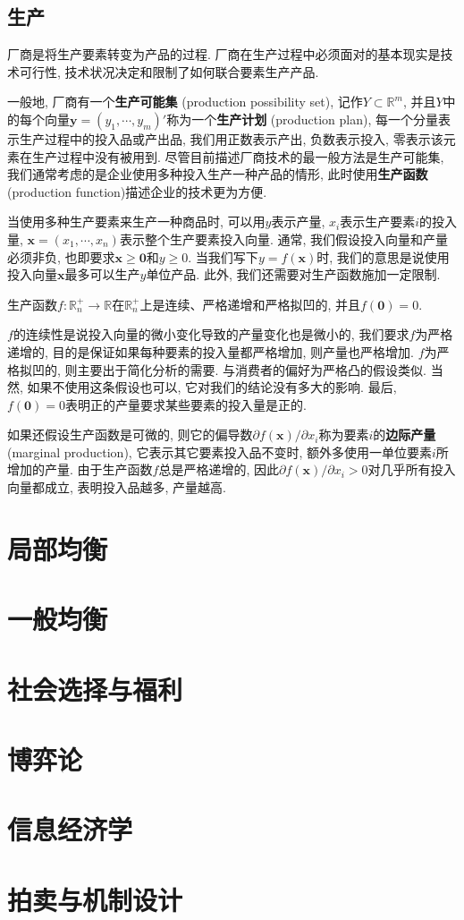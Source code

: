 \documentclass[cn, 12pt, math=mtpro2, bibstyle=apa, blue]{elegantbook}
\newcommand{\R}{\mathbb{R}}
\newcommand{\x}{\mathbf{x}}
\begin{document}
\section{生产}
厂商是将生产要素转变为产品的过程. 厂商在生产过程中必须面对的基本现实是技术可行性, 技术状况决定和限制了如何联合要素生产产品. 

一般地, 厂商有一个\textbf{生产可能集} (production possibility set), 记作$Y\subset\R^m$, 并且$Y$中的每个向量$\mathbold{y}=(y_1,\cdots,y_m)'$称为一个\textbf{生产计划} (production plan), 每一个分量表示生产过程中的投入品或产出品, 我们用正数表示产出, 负数表示投入, 零表示该元素在生产过程中没有被用到. 尽管目前描述厂商技术的最一般方法是生产可能集, 我们通常考虑的是企业使用多种投入生产一种产品的情形, 此时使用\textbf{生产函数} (production function)描述企业的技术更为方便.

当使用多种生产要素来生产一种商品时, 可以用$y$表示产量, $x_i$表示生产要素$i$的投入量, $\x=(x_1,\cdots,x_n)$表示整个生产要素投入向量. 通常, 我们假设投入向量和产量必须非负, 也即要求$\x\ge \mathbf{0}$和$y\ge0$. 当我们写下$y=f(\x)$时, 我们的意思是说使用投入向量$\x$最多可以生产$y$单位产品. 此外, 我们还需要对生产函数施加一定限制.

\begin{definition}
生产函数$f:\R_n^+\to\R$在$\R_n^+$上是连续、严格递增和严格拟凹的, 并且$f(\mathbf{0})=0$.
\end{definition}

$f$的连续性是说投入向量的微小变化导致的产量变化也是微小的, 我们要求$f$为严格递增的, 目的是保证如果每种要素的投入量都严格增加, 则产量也严格增加. $f$为严格拟凹的, 则主要出于简化分析的需要. 与消费者的偏好为严格凸的假设类似. 当然, 如果不使用这条假设也可以, 它对我们的结论没有多大的影响. 最后, $f(\mathbf{0})=0$表明正的产量要求某些要素的投入量是正的.

如果还假设生产函数是可微的, 则它的偏导数$\partial f(\x)/\partial x_i$称为要素$i$的\textbf{边际产量} (marginal production), 它表示其它要素投入品不变时, 额外多使用一单位要素$i$所增加的产量. 由于生产函数$f$总是严格递增的, 因此$\partial f(\x)/\partial x_i>0$对几乎所有投入向量都成立, 表明投入品越多, 产量越高.

\chapter{局部均衡}

\chapter{一般均衡}

\chapter{社会选择与福利}

\chapter{博弈论}

\chapter{信息经济学}

\chapter{拍卖与机制设计}
\end{document}
